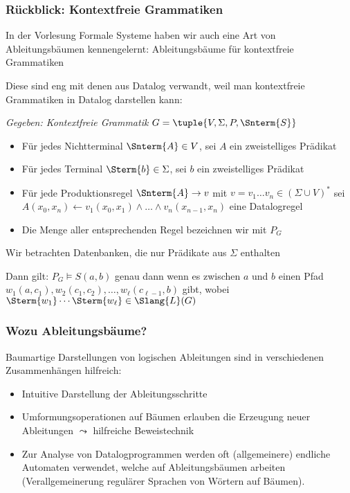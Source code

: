 \documentclass[aspectratio=1610,onlymath]{beamer}
\begin{document}
\begin{frame}\frametitle{Rückblick: Kontextfreie Grammatiken}

In der Vorlesung Formale Systeme haben wir auch eine Art von Ableitungsbäumen kennengelernt:
\alert{Ableitungsbäume für kontextfreie Grammatiken}\bigskip\pause

Diese sind eng mit denen aus Datalog verwandt, weil man kontextfreie Grammatiken in Datalog darstellen kann:\medskip

\emph{Gegeben: Kontextfreie Grammatik} $G=\tuple{V,\Sigma,P,\Snterm{S}}$
\begin{itemize}
\item Für jedes Nichtterminal $\Snterm{A}\in V$, sei $A$ ein zweistelliges Prädikat
\item Für jedes Terminal $\Sterm{b}\in \Sigma$, sei $b$ ein zweistelliges Prädikat
\item Für jede Produktionsregel $\Snterm{A}\to v$ mit $v=v_1\ldots v_n\in(\Sigma\cup V)^*$ sei $A(x_0,x_n)\leftarrow v_1(x_0,x_1)\wedge\ldots\wedge v_n(x_{n-1},x_n)$ eine Datalogregel
\item Die Menge aller entsprechenden Regel bezeichnen wir mit $P_G$
\end{itemize}
Wir betrachten Datenbanken, die nur Prädikate aus $\Sigma$ enthalten\bigskip\pause

Dann gilt: $P_G\models S(a,b)$ genau dann wenn es zwischen $a$ und $b$ einen
Pfad $w_1(a,c_1),w_2(c_1,c_2),\ldots,w_\ell(c_{\ell-1},b)$ gibt, wobei $\Sterm{w_1}\cdots \Sterm{w_\ell}\in\Slang{L}(G)$


\end{frame}

\begin{frame}\frametitle{Wozu Ableitungsbäume?}

Baumartige Darstellungen von logischen Ableitungen sind in verschiedenen Zusammenhängen hilfreich:
\begin{itemize}
\item Intuitive Darstellung der Ableitungsschritte
\item Umformungsoperationen auf Bäumen erlauben die Erzeugung neuer Ableitungen $\leadsto$ hilfreiche Beweistechnik
\item Zur Analyse von Datalogprogrammen werden oft (allgemeinere) endliche Automaten verwendet, welche auf Ableitungsbäumen arbeiten (Verallgemeinerung regulärer Sprachen von Wörtern auf Bäumen).
\end{itemize}

\end{frame}
\end{document}
